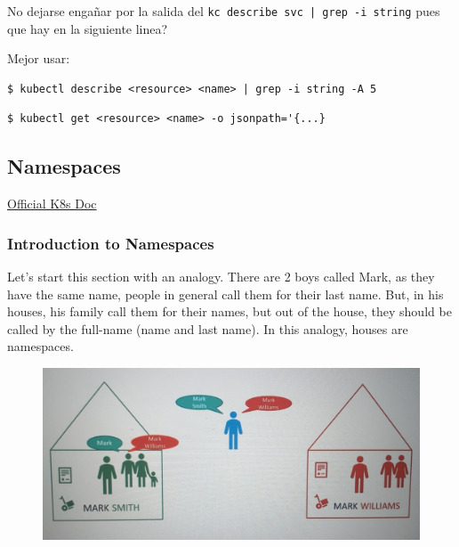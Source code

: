 \documentclass{article}
\newenvironment{blocktemplateIII}[1]{%
    \tcolorbox[beamer,%
    noparskip,breakable,
    ,colframe=Red,%
    colbacklower=LimeGreen!75!LightGreen,%
    title=#1]}%
    {\endtcolorbox}
\newenvironment{codetemplate}[1][]{%
  \mybasecolorbox[#1]
  \itshape
}{%
  \endmybasecolorbox
}
\begin{document}
\begin{blocktemplateIII}{WARNING}
No dejarse engañar por la salida del \verb+kc describe svc | grep -i string+ pues que hay en la siguiente linea? 

Mejor usar:
\begin{codetemplate}{}
\begin{verbatim}
$ kubectl describe <resource> <name> | grep -i string -A 5
\end{verbatim}
\end{codetemplate}
\begin{codetemplate}{}
\begin{verbatim}
$ kubectl get <resource> <name> -o jsonpath='{...}
\end{verbatim}
\end{codetemplate}
\end{blocktemplateIII}

\newpage
\subsection{Namespaces}

\href{https://kubernetes.io/docs/concepts/overview/working-with-objects/namespaces/}{Official K8s Doc}

\subsubsection{Introduction to Namespaces}
\label{IntNames}

Let's start this section with an analogy. There are 2 boys called Mark, as they have the same name, people in general call them for their last name. But, in his houses, his family call them for their names, but out of the house, they should be called by the full-name (name and last name). In this analogy, houses are namespaces.

\begin{figure}[H]
    \centering
    \includegraphics[scale=0.4]{pictures/namespace1.jpeg}
\end{figure}
\end{document}
